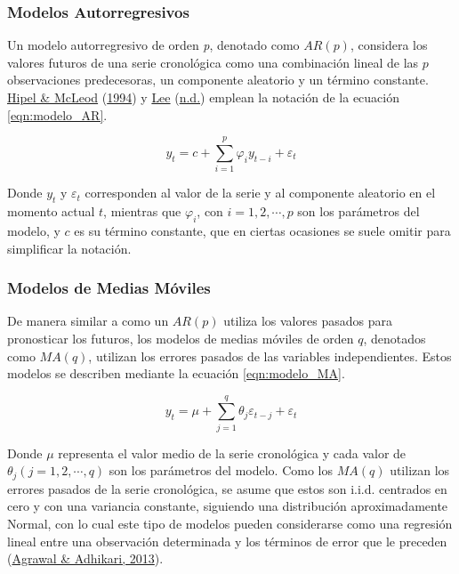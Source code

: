 \documentclass[
]{article}
\begin{document}
\subsubsection{Modelos Autorregresivos}

Un modelo autorregresivo de orden \emph{p}, denotado como \(AR(p)\),
considera los valores futuros de una serie cronológica como una
combinación lineal de las \(p\) observaciones predecesoras, un
componente aleatorio y un término constante.
\protect\hyperlink{ref-Hipel}{Hipel \& McLeod}
(\protect\hyperlink{ref-Hipel}{1994}) y \protect\hyperlink{ref-Lee}{Lee}
(\protect\hyperlink{ref-Lee}{n.d.}) emplean la notación de la ecuación
\eqref{eqn:modelo_AR}.

\begin{equation}
\label{eqn:modelo_AR}
y_t=c+\sum_{i=1}^p \varphi_iy_{t-i}+\varepsilon_t
\end{equation}

Donde \(y_t\) y \(\varepsilon_t\) corresponden al valor de la serie y al
componente aleatorio en el momento actual \(t\), mientras que
\(\varphi_i\), con \(i=1,2,\cdots,p\) son los parámetros del modelo, y
\(c\) es su término constante, que en ciertas ocasiones se suele omitir
para simplificar la notación.

\subsubsection{Modelos de Medias Móviles}

De manera similar a como un \(AR(p)\) utiliza los valores pasados para
pronosticar los futuros, los modelos de medias móviles de orden \(q\),
denotados como \(MA(q)\), utilizan los errores pasados de las variables
independientes. Estos modelos se describen mediante la ecuación
\eqref{eqn:modelo_MA}.

\begin{equation}
\label{eqn:modelo_MA}
y_t=\mu+\sum_{j=1}^q \theta_j \varepsilon_{t-j}+\varepsilon_t
\end{equation}

Donde \(\mu\) representa el valor medio de la serie cronológica y cada
valor de \(\theta_j(j=1,2,\cdots,q)\) son los parámetros del modelo.
Como los \(MA(q)\) utilizan los errores pasados de la serie cronológica,
se asume que estos son i.i.d. centrados en cero y con una variancia
constante, siguiendo una distribución aproximadamente Normal, con lo
cual este tipo de modelos pueden considerarse como una regresión lineal
entre una observación determinada y los términos de error que le
preceden (\protect\hyperlink{ref-stationary_def}{Agrawal \& Adhikari,
2013}).
\end{document}
